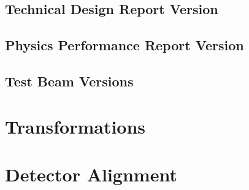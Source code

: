 \subsection{Technical Design Report Version}

\subsection{Physics Performance Report Version}

\subsection{Test Beam Versions}

\section{Transformations}

\section{Detector Alignment}